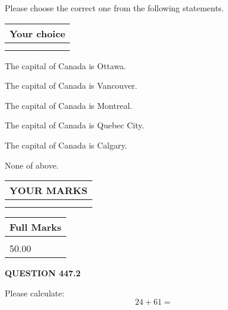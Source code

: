 \documentclass[12pt]{article}
\begin{document}
  
Please choose the correct one from the following statements.
  
  
\noindent\hspace{3.0in} \begin{tabular}{|l|}
\hline
Your choice \\
\hline
 \\ 
 \\ 
\hline
\end{tabular}
  
  
 
 
The capital of Canada is Ottawa.
 
 
The capital of Canada is Vancouver.
 
 
The capital of Canada is Montreal.
 
 
The capital of Canada is Quebec City.
 
 
The capital of Canada is Calgary.
 
 
 None of above.
 
 
  
\vspace{0.2in}
  
\noindent\begin{tabular}{|l|}
\hline
 YOUR MARKS  \\
\hline
 \\ 
 \\ 
\hline
\end{tabular}
\hspace{0.05in} \begin{tabular}{|l|}
\hline
 Full Marks  \\
\hline
 \\ 
50.00 \\
\hline
\end{tabular}
{\textbf{\Large{QUESTION
447.2 
}}}
  
  
 
Please calculate:
\begin{equation}
24 +  %
61 = \nonumber
\end{equation}
 

 

 
   
   
 \vspace{0.2in}
 
   
   
   
   
\end{document}
